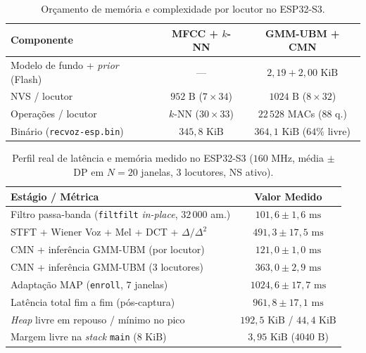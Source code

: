 \documentclass[9pt,technote,a4paper]{IEEEtran}
\begin{document}
\begin{table}[t]
\centering
\footnotesize
\setlength{\tabcolsep}{3.5pt}
\caption{Orçamento de memória e complexidade por locutor no ESP32-S3.}
\label{tab:recursos}
\begin{tabular}{lcc}
\toprule
\textbf{Componente} & \textbf{MFCC + $k$-NN} & \textbf{GMM-UBM + CMN} \\
\midrule
Modelo de fundo + \textit{prior} (Flash) & --- & $2{,}19 + 2{,}00\text{ KiB}$ \\
NVS / locutor & $952\text{ B}$ ($7{\times}34$) & $1024\text{ B}$ ($8{\times}32$) \\
Operações / locutor & $k$-NN ($30{\times}33$) & $22\,528$ MACs ($88$ q.) \\
Binário (\texttt{recvoz-esp.bin}) & $345{,}8\text{ KiB}$ & $364{,}1\text{ KiB}$ ($64\%$ livre) \\
\bottomrule
\end{tabular}
\end{table}

\begin{table}[t]
\centering
\scriptsize
\setlength{\tabcolsep}{3pt}
\caption{Perfil real de latência e memória medido no ESP32-S3 ($160\text{ MHz}$, média $\pm$ DP em $N=20$ janelas, $3$ locutores, NS ativo).}
\label{tab:latencia}
\begin{tabular}{lc}
\toprule
\textbf{Estágio / Métrica} & \textbf{Valor Medido} \\
\midrule
Filtro passa-banda (\texttt{filtfilt} \textit{in-place}, $32\,000$ am.) & $101{,}6 \pm 1{,}6\text{ ms}$ \\
STFT + Wiener Voz + Mel + DCT + $\Delta/\Delta^2$ & $491{,}3 \pm 17{,}5\text{ ms}$ \\
CMN + inferência GMM-UBM (por locutor) & $121{,}0 \pm 1{,}0\text{ ms}$ \\
CMN + inferência GMM-UBM ($3$ locutores) & $363{,}0 \pm 2{,}9\text{ ms}$ \\
Adaptação MAP (\texttt{enroll}, $7$ janelas) & $1024{,}6 \pm 17{,}7\text{ ms}$ \\
Latência total fim a fim (pós-captura) & $961{,}8 \pm 17{,}1\text{ ms}$ \\
\textit{Heap} livre em repouso / mínimo no pico & $192{,}5\text{ KiB}$ / $44{,}4\text{ KiB}$ \\
Margem livre na \textit{stack} \texttt{main} ($8\text{ KiB}$) & $3{,}95\text{ KiB}$ ($4040\text{ B}$) \\
\bottomrule
\end{tabular}
\end{table}
\end{document}
